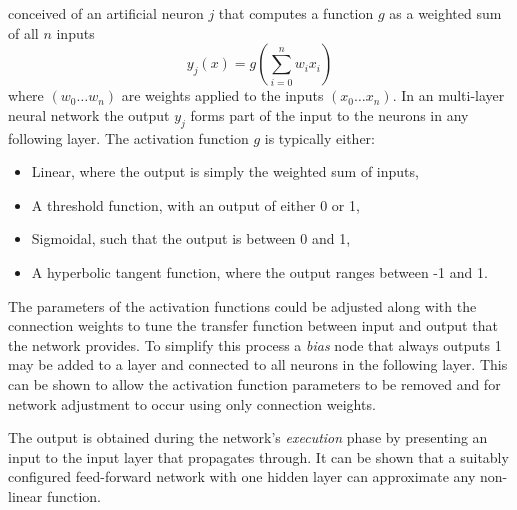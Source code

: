  conceived of an artificial neuron $j$ that
computes a function $g$ as a weighted sum of all $n$ inputs
\begin{equation}
y_j(x) = g \left(\sum_{i=0}^n w_ix_i\right)
\end{equation}
where $(w_0 \dotsc w_n)$ are weights applied to the inputs $(x_0 \dotsc x_n)$.
In an multi-layer neural network the output $y_j$ forms part of the input
to the neurons in any following layer.  The activation function $g$ is
typically either:
\begin{itemize}
  \item Linear, where the output is simply the weighted sum of inputs,
  \item A threshold function, with an output of either 0 or 1,
  \item Sigmoidal, such that the output is between 0 and 1,
  \item A hyperbolic tangent function, where the output ranges between -1 and
  1.
\end{itemize}
The parameters of the activation functions could be adjusted along with the
connection weights to tune the transfer function between input and output that
the network provides.  To simplify this process a \textit{bias} node that always outputs 1
may be added to a layer and connected to all neurons in the following layer.
This can be shown to allow the activation function parameters to be removed and
for network adjustment to occur using only connection weights.

The output is obtained during the network's \textit{execution} phase by
presenting an input to the input layer that propagates through.  It can be
shown that a suitably configured feed-forward network with one hidden layer can
approximate any non-linear function.

